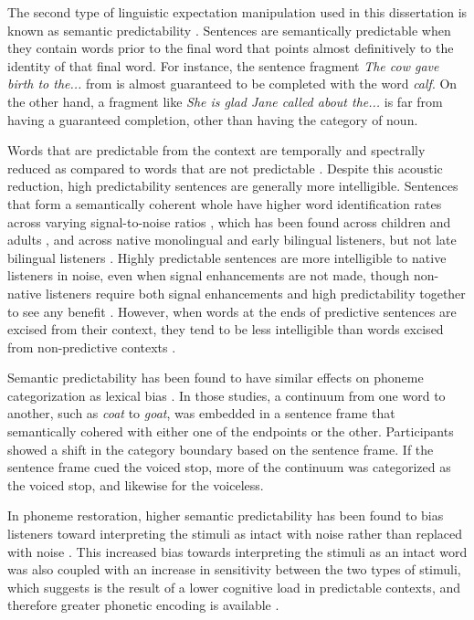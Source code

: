 The second type of linguistic expectation manipulation used in this dissertation is known as semantic predictability \citep{Kalikow1977}.
Sentences are semantically predictable when they contain words prior to the final word that points almost definitively to the identity of that final word.  
For instance, the sentence fragment \emph{The cow gave birth to the...} from \citet{Kalikow1977} is almost guaranteed to be completed with the word \emph{calf}.  
On the other hand, a fragment like \emph{She is glad Jane called about the...} is far from having a guaranteed completion, other than having the category of noun.

Words that are predictable from the context are temporally and spectrally reduced as compared to words that are not predictable \cite{Scarborough2010, Clopper2008}. Despite this acoustic reduction, high predictability sentences are generally more intelligible.
Sentences that form a semantically coherent whole have higher word identification rates across varying signal-to-noise ratios \citep{Kalikow1977}, which has been found across children and adults \citep{Fallon2002}, and across native monolingual and early bilingual listeners, but not late bilingual listeners \citep{Mayo1997}.
Highly predictable sentences are more intelligible to native listeners in noise, even when signal enhancements are not made, though non-native listeners require both signal enhancements and high predictability together to see any benefit \cite{Bradlow2007}.
However, when words at the ends of predictive sentences are excised from their context, they tend to be less intelligible than words excised from non-predictive contexts \citep{Lieberman1963}.

Semantic predictability has been found to have similar effects on phoneme categorization as lexical bias \citep{Connine1987, Borsky1998}.  
In those studies, a continuum from one word to another, such as \emph{coat} to \emph{goat}, was embedded in a sentence frame that semantically cohered with either one of the endpoints or the other.  
Participants showed a shift in the category boundary based on the sentence frame.
If the sentence frame cued the voiced stop, more of the continuum was categorized as the voiced stop, and likewise for the voiceless.

In phoneme restoration, higher semantic predictability has been found to bias listeners toward interpreting the stimuli as intact with noise rather than replaced with noise \citep{Samuel1981}.
This increased bias towards interpreting the stimuli as an intact word was also coupled with an increase in sensitivity between the two types of stimuli, which \citet{Samuel1981} suggests is the result of a lower cognitive load in predictable contexts, and therefore greater phonetic encoding is available \citep[see also][]{Mattys2011}.

